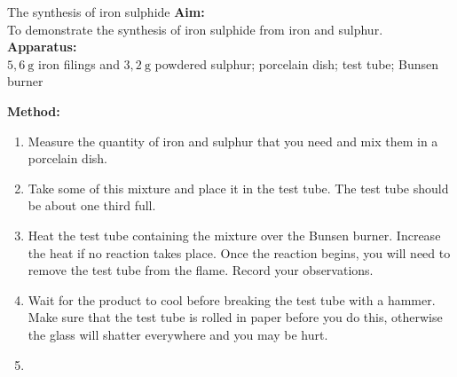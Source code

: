             \begin{g_experiment}{The synthesis of iron sulphide }
            \nopagebreak
            \label{m38709*id63437}\noindent{}\textbf{Aim:} \\
     To demonstrate the synthesis of iron sulphide from iron and sulphur. \\
        \label{m38709*id63447}\noindent{}\textbf{Apparatus:} \\
$5,6~\text{g}$ iron filings and $3,2~\text{g}$ powdered sulphur; porcelain dish; test tube; Bunsen burner \\
        \label{m38709*id63457}
    \setcounter{subfigure}{0}
    \begin{center}
    \end{center}
        \label{m38709*id63467}\noindent{}\textbf{Method:} 
        \label{m38709*id63473}\begin{enumerate}[noitemsep, label=\textbf{\arabic*}. ] 
            \label{m38709*uid20}\item 
Measure the quantity of iron and sulphur that you need and mix them in a porcelain dish.
\label{m38709*uid21}\item 
Take some of this mixture and place it in the test tube. The test tube should be about one third full.
\label{m38709*uid22}\item 
Heat the test tube containing the mixture over the Bunsen burner. Increase the heat if no reaction takes place. Once the reaction begins, you will need to remove the test tube from the flame. Record your observations.
\label{m38709*uid23}\item
 Wait for the product to cool before breaking the test tube with a hammer. Make sure that the test tube is rolled in paper before you do this, otherwise the glass will shatter everywhere and you may be hurt.
\label{m38709*uid24}\item 

\end{enumerate}
\end{g_experiment}
